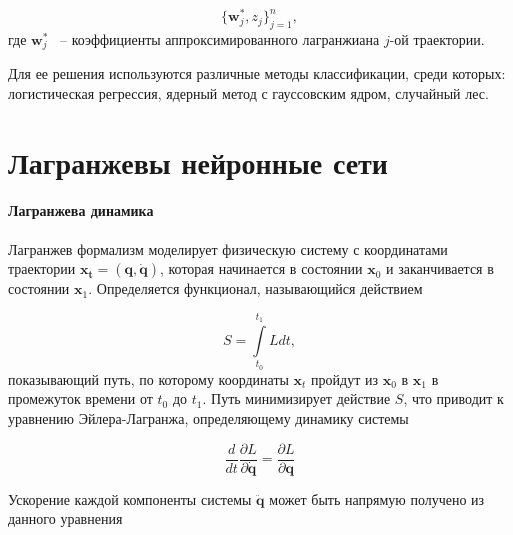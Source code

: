 \documentclass[12pt, twoside]{article}
\begin{document}
        $$\{\textbf{w}^*_j, z_j\}_{j=1}^n,$$
        где $\textbf{w}^*_j$ ~-- коэффициенты аппроксимированного лагранжиана $j$-ой траектории.
    
        Для ее решения используются различные методы классификации, среди которых: логистическая регрессия, ядерный метод с гауссовским ядром, случайный лес.

\section{Лагранжевы нейронные сети}

    \paragraph{Лагранжева динамика}		

        Лагранжев формализм \cite{cranmer2020lagrangian} моделирует физическую систему с координатами траектории $\mathbf{x_t} = (\mathbf{q}, \dot{\mathbf{q}})$, которая начинается в состоянии $\mathbf{x}_0$ и заканчивается в состоянии $\mathbf{x}_1$. Определяется функционал, называющийся действием

        $$S=\int\limits_{t_0}^{t_1} L dt,$$
        показывающий путь, по которому координаты $\mathbf{x}_t$ пройдут из $\mathbf{x}_0$ в $\mathbf{x}_1$ в промежуток времени от $t_0$ до $t_1$. Путь минимизирует действие $S$, что приводит к уравнению Эйлера-Лагранжа, определяющему динамику системы

        $$\frac{d}{dt} \frac{\partial L}{\partial \dot{\mathbf{q}}} = \frac{\partial L}{\partial \mathbf{q}}$$

        Ускорение каждой компоненты системы $ \ddot{\mathbf{q}}$ может быть напрямую получено из данного уравнения
\end{document}
